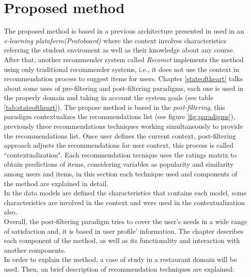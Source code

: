 \chapter{Proposed method}\label{method}

The proposed method is based  in a previous architecture presented in
\cite{garcia2009hybrid} used in an \textit{e-learning plataform(Protoboard)}
where the context  involves characteristics referring the student
enviroment as well as their knowledge about any course.  After that,
another recommender system called \textit{Recomet}\cite{ramirez2013restaurant}
implements the method using only traditional recommender systems,
i.e., it does not use the context in recommendation process  to
suggest items for users.  
Chapter \ref{stateoftheart}  talks about some uses of pre-filtering and 
post-filtering paradigms, each one is used in the properly domain 
and taking in account the system goals (see table \ref{tab:stateoftheart}).  
The propose method is based in the \textit{post-filtering}, 
this paradigm contextualizes the recommendations list
(see figure \ref{fig:paradigms}), previously three recommendations
techniques  working simultaneously to provide the recommendations
list. Once user defines the current context,  post-filtering approach
adjusts the  recommendations for user context, this process is called
``contextualization". 
Each recommendation tecnique uses the ratings
matrix to obtain  predictions of items, considering variables as
popularity and similarity   among users and items, in this section
each technique used and  components of the method are explained in
detail.\\  In the data models are defined the characteristics that
contains  each model, some characteristics are involved in the context
and were used in the contextualization also.\\  Overall, the 
post-filtering paradigm tries to cover the  user's needs in a wide range of
satisfaction and, it is based in user  profile' information. The
chapter describes  each component of the  method, as well as its
functionality and  interaction with  another components.\\ 
In order to explain the method, a case of study in a
restaurant   domain will be used. Then, an brief description of
recommendation  techniques are explained: 

